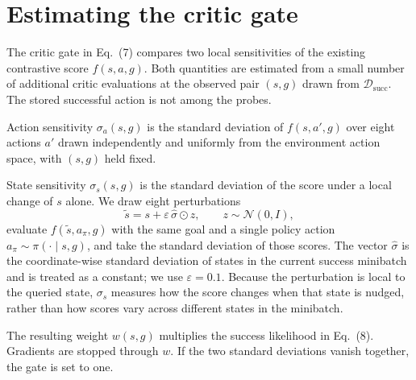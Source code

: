 \section{Estimating the critic gate}
\label{app:critic-gate}

The critic gate in Eq.~(7) compares two local sensitivities of the
existing contrastive score $f(s,a,g)$. Both quantities are estimated
from a small number of additional critic evaluations at the observed
pair $(s,g)$ drawn from $\mathcal{D}_{\mathrm{succ}}$. The stored
successful action is not among the probes.

Action sensitivity $\sigma_a(s,g)$ is the standard deviation of
$f(s,a',g)$ over eight actions $a'$ drawn independently and uniformly
from the environment action space, with $(s,g)$ held fixed.

State sensitivity $\sigma_s(s,g)$ is the standard deviation of the
score under a local change of $s$ alone. We draw eight perturbations
\begin{equation*}
\tilde{s}
=
s + \varepsilon\,\hat{\sigma}\odot z,
\qquad
z\sim\mathcal{N}(0,I),
\end{equation*}
evaluate $f(\tilde{s},a_{\pi},g)$ with the same goal and a single
policy action $a_{\pi}\sim\pi(\cdot\mid s,g)$, and take the standard
deviation of those scores. The vector $\hat{\sigma}$ is the
coordinate-wise standard deviation of states in the current success
minibatch and is treated as a constant; we use $\varepsilon=0.1$.
Because the perturbation is local to the queried state, $\sigma_s$
measures how the score changes when that state is nudged, rather than
how scores vary across different states in the minibatch.

The resulting weight $w(s,g)$ multiplies the success likelihood in
Eq.~(8). Gradients are stopped through $w$. If the two standard
deviations vanish together, the gate is set to one.
